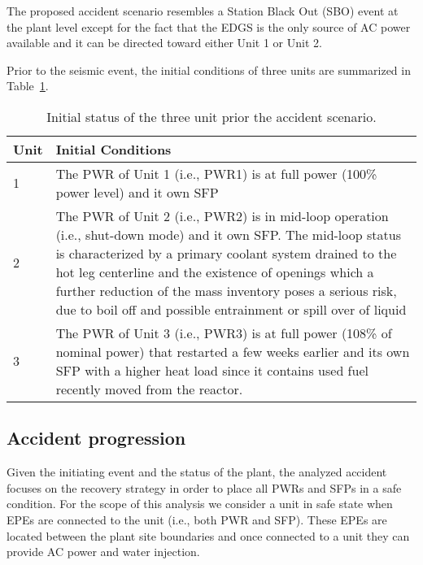The proposed accident scenario resembles a Station Black Out (SBO) event at the plant level except for the 
fact that the EDGS is the only source of AC power available and it can be directed toward either Unit 1 or Unit 2.

Prior to the seismic event, the initial conditions of three units are summarized in Table~\ref{tab:unitsStatus}.

\begin{table}
  \begin{tabular}{ | l | p{10cm} | }
    \hline      
      \textbf{Unit} & \textbf{Initial Conditions} \\
      \hline \hline
      1 &       The PWR of Unit 1 (i.e., PWR1) is at full power (100\% power level) and it own SFP \\ \hline
      2 &       The PWR of Unit 2 (i.e., PWR2) is in mid-loop operation (i.e., shut-down mode) and it own SFP. 
                The mid-loop status is characterized by a primary coolant system drained to the 
                hot leg centerline and the existence of openings which a further reduction of 
                the mass inventory poses a serious risk, due to boil off and possible entrainment 
                or spill over of liquid\\ \hline
      3 &       The PWR of Unit 3 (i.e., PWR3) is at full power (108\% of nominal power) that restarted a few weeks 
                earlier and its own SFP with a higher heat load since it contains used fuel recently 
                moved from the reactor. \\
    \hline  
  \end{tabular}
  \caption{Initial status of the three unit prior the accident scenario.}
  \label{tab:unitsStatus}
\end{table}

\subsection{Accident progression}
\label{sec:accidentProgression}

Given the initiating event and the status of the plant, the analyzed accident focuses on the recovery strategy 
in order to place all PWRs and SFPs in a safe condition. For the scope of this analysis we consider a unit in
safe state when EPEs are connected to the unit (i.e., both PWR and SFP). These EPEs 
are located between the plant site boundaries and once connected to a unit they can provide AC power and water injection.

